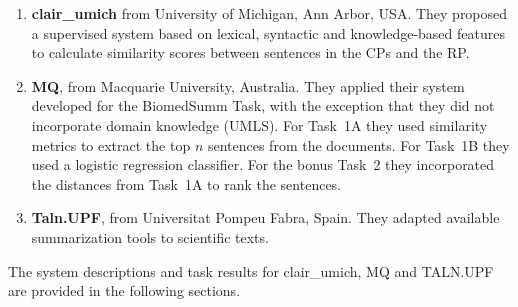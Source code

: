 \documentclass[11pt]{article}
\begin{document}
\begin{enumerate}
\item{{\bf clair\_umich} from University of Michigan, Ann Arbor, USA. They proposed a supervised system based on lexical, syntactic and knowledge-based features to calculate similarity scores between sentences in the CPs and the RP.}
\vspace{-.3cm}
\item{{\bf MQ}, from Macquarie University, Australia. They applied their system developed for the BiomedSumm Task,
  with the exception that they did not incorporate domain knowledge (UMLS). For Task~1A they used similarity metrics to extract the top $n$ sentences from the documents. For Task~1B they used a logistic regression classifier. For the bonus Task~2 they incorporated the distances from Task~1A to rank the sentences.}
\vspace{-.3cm}
\item{{\bf Taln.UPF}, from Universitat Pompeu Fabra, Spain. They adapted available summarization tools to scientific texts.}
%
\end{enumerate}
The system descriptions and task results for clair\_umich, MQ and TALN.UPF are provided in the following sections. 
\end{document}
